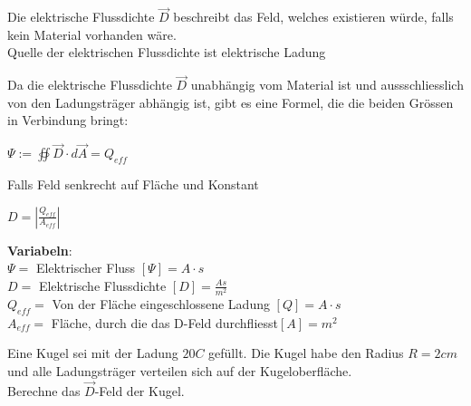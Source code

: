 \beginip
Die elektrische Flussdichte $\vec{D}$ beschreibt das Feld, welches existieren würde, falls kein Material vorhanden wäre. \\
Quelle der elektrischen Flussdichte ist elektrische Ladung
\iend

Da die elektrische Flussdichte  $\vec{D}$ unabhängig vom Material ist und aussschliesslich von den Ladungsträger abhängig ist,
gibt es eine Formel, die die beiden Grössen in Verbindung bringt:




\newpage
{}

\begingl
\begin{center}
	\formulaBegin
	$\Psi := \oiint \vec{D}\cdot d\vec{A} = Q_{eff}$
	\formulaEnd

	Falls Feld senkrecht auf Fläche und Konstant \\
	\fspace

	\formulaBegin
	$D = |\frac{Q_{eff}}{A_{eff}}|$
	\formulaEnd

\end{center}
\textbf{Variabeln}: \\
$\Psi = $ Elektrischer Fluss $ [\Psi] = A \cdot s $ \\
$D = $ Elektrische Flussdichte $ [D] = \frac{As}{m^2}$ \\
$ Q_{eff} = $ Von der Fläche eingeschlossene Ladung $[Q] = A\cdot s$ \\
$ A_{eff} = $ Fläche, durch die das D-Feld durchfliesst$ [A] = m^2$ \\

\iend

\beginbsp
Eine Kugel sei mit der Ladung $20 C$ gefüllt. Die Kugel habe den Radius $R = 2cm$ und alle Ladungsträger verteilen sich auf der Kugeloberfläche. \\
Berechne das $\vec{D}$-Feld der Kugel.
\iend

